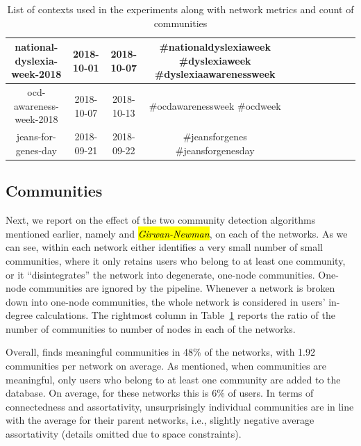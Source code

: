 \documentclass[runningheads]{llncs}
\begin{document}
\begin{table}
{\begin{tabular}{|c|c|c|c|c|c|c|c|c|c|c|}
			\hline 
			\rule[-1ex]{0pt}{2.5ex}  national-dyslexia-week-2018          & 2018-10-01  & 2018-10-07 & \#nationaldyslexiaweek \#dyslexiaweek \#dyslexiaawarenessweek               & & & & & \\ 
			\hline 
			\rule[-1ex]{0pt}{2.5ex}  ocd-awareness-week-2018              & 2018-10-07  & 2018-10-13 & \#ocdawarenessweek \#ocdweek         & & & & & \\ 
			\hline 
			\rule[-1ex]{0pt}{2.5ex}  jeans-for-genes-day                  & 2018-09-21  & 2018-09-22 & \#jeansforgenes \#jeansforgenesday           & & & & & \\ 
			\hline 
	\end{tabular}
	}
	
	\caption{List of contexts used in the experiments along with network metrics and count of \demon communities}
	\label{tab:contexts}
\end{table}	 


\subsection{Communities}  \label{sec:communities}

Next, we report on the effect of the two community detection algorithms mentioned earlier, namely \demon and \hl{\textit{Girwan-Newman}}, on each of the networks. 
As we can see, within each network \demon either identifies a very small number of small communities, where it only retains users who belong to at least one community, or it ``disintegrates'' the network into degenerate, one-node communities. 
One-node communities are ignored by the pipeline. Whenever a network is broken down into one-node communities, the whole network is considered in users' in-degree calculations.
The rightmost column in Table~\ref{tab:contexts} reports the ratio of the number of communities to number of nodes in each of the networks.

Overall, \demon finds meaningful communities in 48\% of the networks, with 1.92 communities per network on average. 
As mentioned, when communities are meaningful, only users who belong to at least one community are added to the database. 
On average, for these networks this is 6\% of users.
In terms of connectedness and assortativity, unsurprisingly individual \demon communities are in line with the average for their parent networks, i.e., slightly negative average assortativity (details omitted due to space constraints).
\end{document}
